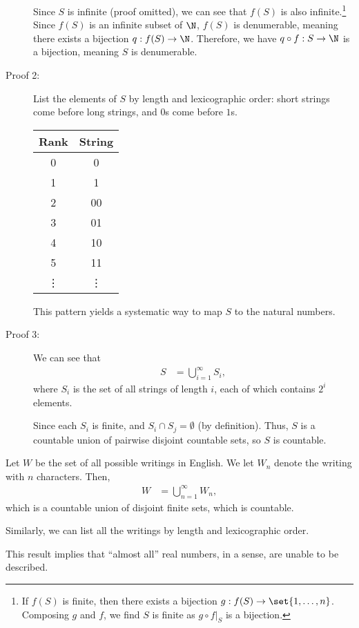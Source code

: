 \documentclass[10pt]{mypackage}
\begin{document}
\begin{example}
\begin{description}
      Since $S$ is infinite (proof omitted), we can see that $f(S)$ is also infinite.\footnote{If $f(S)$ is finite, then there exists a bijection $g: f(S)\rightarrow\set{1,\dots,n}$. Composing $g$ and $f$, we find $S$ is finite as $g\circ f|_{S}$ is a bijection.} Since $f(S)$ is an infinite subset of $\N$, $f(S)$ is denumerable, meaning there exists a bijection $q: f(S) \rightarrow \N$. Therefore, we have $q\circ f: S\rightarrow \N$ is a bijection, meaning $S$ is denumerable.
    \item[Proof 2:] List the elements of $S$ by length and lexicographic order: short strings come before long strings, and $0$s come before $1$s.
      \begin{center}
        \begin{tabular}{c|c}
          Rank & String\\
          \hline
          0 & 0\\
          1 & 1\\
          2 & 00\\
          3 & 01\\
          4 & 10\\
          5 & 11\\
          \vdots & \vdots
        \end{tabular}
      \end{center}
      This pattern yields a systematic way to map $S$ to the natural numbers.
    \item[Proof 3:] We can see that
      \begin{align*}
        S &= \bigcup_{i=1}^{\infty} S_i,
      \end{align*}
      where $S_i$ is the set of all strings of length $i$, each of which contains $2^i$ elements.\newline

      Since each $S_i$ is finite, and $S_i \cap S_j = \emptyset$ (by definition). Thus, $S$ is a countable union of pairwise disjoint countable sets, so $S$ is countable.
  \end{description}
\end{example}
\begin{example}
  Let $W$ be the set of all possible writings in English. We let $W_n$ denote the writing with $n$ characters. Then,
  \begin{align*}
    W &= \bigcup_{n=1}^{\infty}W_n,
  \end{align*}
  which is a countable union of disjoint finite sets, which is countable.\newline

  Similarly, we can list all the writings by length and lexicographic order.\newline

  This result implies that ``almost all'' real numbers, in a sense, are unable to be described.
\end{example}
\end{document}
